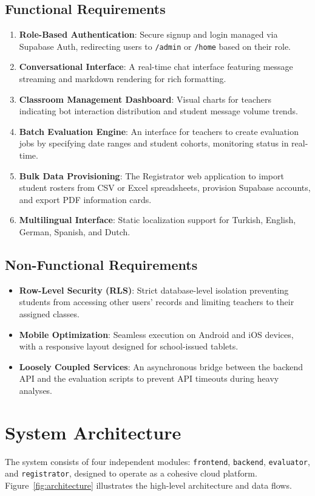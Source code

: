 \documentclass[12pt,a4paper,oneside]{report}
\begin{document}
    \subsection{Functional Requirements}
    \begin{enumerate}
        \item \textbf{Role-Based Authentication}: Secure signup and login managed via Supabase Auth, redirecting users to \texttt{/admin} or \texttt{/home} based on their role.
        \item \textbf{Conversational Interface}: A real-time chat interface featuring message streaming and markdown rendering for rich formatting.
        \item \textbf{Classroom Management Dashboard}: Visual charts for teachers indicating bot interaction distribution and student message volume trends.
        \item \textbf{Batch Evaluation Engine}: An interface for teachers to create evaluation jobs by specifying date ranges and student cohorts, monitoring status in real-time.
        \item \textbf{Bulk Data Provisioning}: The Registrator web application to import student rosters from CSV or Excel spreadsheets, provision Supabase accounts, and export PDF information cards.
        \item \textbf{Multilingual Interface}: Static localization support for Turkish, English, German, Spanish, and Dutch.
    \end{enumerate}

    \subsection{Non-Functional Requirements}
    \begin{itemize}
        \item \textbf{Row-Level Security (RLS)}: Strict database-level isolation preventing students from accessing other users' records and limiting teachers to their assigned classes.
        \item \textbf{Mobile Optimization}: Seamless execution on Android and iOS devices, with a responsive layout designed for school-issued tablets.
        \item \textbf{Loosely Coupled Services}: An asynchronous bridge between the backend API and the evaluation scripts to prevent API timeouts during heavy analyses.
    \end{itemize}

    \section{System Architecture}
    The system consists of four independent modules: \texttt{frontend}, \texttt{backend}, \texttt{evaluator}, and \texttt{registrator}, designed to operate as a cohesive cloud platform. Figure~\ref{fig:architecture} illustrates the high-level architecture and data flows.
\end{document}
